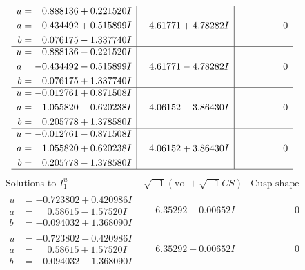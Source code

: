 \documentclass[1p]{elsarticle_modified}
\theoremstyle{definition}
\newcommand{\I}{\sqrt{-1}}
\begin{document}
$$\begin{array}{c|c|c}
\begin{aligned}
u &= \phantom{-}0.888136 + 0.221520 I \\
a &= -0.434492 + 0.515899 I \\
b &= \phantom{-}0.076175 - 1.337740 I\end{aligned}
 & \phantom{-}4.61771 + 4.78282 I & \phantom{-0.000000 } 0 \\ \hline\begin{aligned}
u &= \phantom{-}0.888136 - 0.221520 I \\
a &= -0.434492 - 0.515899 I \\
b &= \phantom{-}0.076175 + 1.337740 I\end{aligned}
 & \phantom{-}4.61771 - 4.78282 I & \phantom{-0.000000 } 0 \\ \hline\begin{aligned}
u &= -0.012761 + 0.871508 I \\
a &= \phantom{-}1.055820 - 0.620238 I \\
b &= \phantom{-}0.205778 + 1.378580 I\end{aligned}
 & \phantom{-}4.06152 - 3.86430 I & \phantom{-0.000000 } 0 \\ \hline\begin{aligned}
u &= -0.012761 - 0.871508 I \\
a &= \phantom{-}1.055820 + 0.620238 I \\
b &= \phantom{-}0.205778 - 1.378580 I\end{aligned}
 & \phantom{-}4.06152 + 3.86430 I & \phantom{-0.000000 } 0\\
 \hline 
 \end{array}$$\newpage$$\begin{array}{c|c|c}  
\text{Solutions to }I^u_{1}& \I (\text{vol} + \sqrt{-1}CS) & \text{Cusp shape}\\
 \hline 
\begin{aligned}
u &= -0.723802 + 0.420986 I \\
a &= \phantom{-}0.58615 - 1.57520 I \\
b &= -0.094032 + 1.368090 I\end{aligned}
 & \phantom{-}6.35292 - 0.00652 I & \phantom{-0.000000 } 0 \\ \hline\begin{aligned}
u &= -0.723802 - 0.420986 I \\
a &= \phantom{-}0.58615 + 1.57520 I \\
b &= -0.094032 - 1.368090 I\end{aligned}
 & \phantom{-}6.35292 + 0.00652 I & \phantom{-0.000000 } 0 \\ \hline\begin{aligned}

\end{aligned}
\end{array}$$
\end{document}

